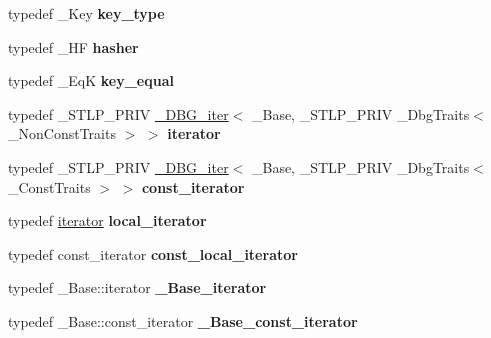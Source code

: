 \begin{DoxyCompactItemize}
typedef \+\_\+\+Key {\bfseries key\+\_\+type}
\item 
\mbox{\label{classhashtable_a0cd460e986b48a2c0e4f043ac69c915e}} 
typedef \+\_\+\+HF {\bfseries hasher}
\item 
\mbox{\label{classhashtable_a3a42422d16cf88f6a2db6bd5166fb242}} 
typedef \+\_\+\+EqK {\bfseries key\+\_\+equal}
\item 
\mbox{\label{classhashtable_a74d69c6b5ac8884bac718a43497b238b}} 
typedef \+\_\+\+S\+T\+L\+P\+\_\+\+P\+R\+IV \hyperlink{struct___d_b_g__iter}{\+\_\+\+D\+B\+G\+\_\+iter}$<$ \+\_\+\+Base, \+\_\+\+S\+T\+L\+P\+\_\+\+P\+R\+IV \+\_\+\+Dbg\+Traits$<$ \+\_\+\+Non\+Const\+Traits $>$ $>$ {\bfseries iterator}
\item 
\mbox{\label{classhashtable_a954aee0fabb8eace3b5e94948da416ec}} 
typedef \+\_\+\+S\+T\+L\+P\+\_\+\+P\+R\+IV \hyperlink{struct___d_b_g__iter}{\+\_\+\+D\+B\+G\+\_\+iter}$<$ \+\_\+\+Base, \+\_\+\+S\+T\+L\+P\+\_\+\+P\+R\+IV \+\_\+\+Dbg\+Traits$<$ \+\_\+\+Const\+Traits $>$ $>$ {\bfseries const\+\_\+iterator}
\item 
\mbox{\label{classhashtable_a643e55e87f6fa1bc1f7cee78ffd344fa}} 
typedef \hyperlink{structiterator}{iterator} {\bfseries local\+\_\+iterator}
\item 
\mbox{\label{classhashtable_a885a6cf3309ce9e740297af986566131}} 
typedef const\+\_\+iterator {\bfseries const\+\_\+local\+\_\+iterator}
\item 
\mbox{\label{classhashtable_a6a7ee3689a715b70258c8060e41e44e0}} 
typedef \+\_\+\+Base\+::iterator {\bfseries \+\_\+\+Base\+\_\+iterator}
\item 
\mbox{\label{classhashtable_a9d2dd6c994b75c3893f29f96ef6c619a}} 
typedef \+\_\+\+Base\+::const\+\_\+iterator {\bfseries \+\_\+\+Base\+\_\+const\+\_\+iterator}
\end{DoxyCompactItemize}
